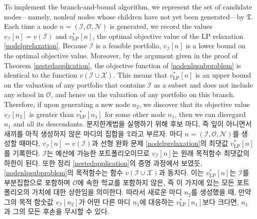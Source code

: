 \documentclass[11pt]{article} %
\theoremstyle{definition}
\theoremstyle{definition}
\begin{document}
\ifen
To implement the branch-and-bound algorithm, we represent the set of candidate nodes---namely, nonleaf nodes whose children have not yet been generated---by $\mathfrak{T}$. Each time a node $n= (\mathcal{I}, \mathcal{O}, \mathcal{N})$ is generated, we record the values $v_{\mathcal{I}}[n] = v(\mathcal{I})$ and $v^*_{\mathrm{LP}}[n]$, the optimal objective value of the LP relaxation \eqref{nodelprelaxation}. Because $\mathcal{I}$ is a feasible portfolio, $v_{\mathcal{I}}[n]$ is a lower bound on the optimal objective value. Moreover, by the argument given in the proof of Theorem \ref{nestedapplication}, the objective function of  \eqref{nodenlpsubproblem} is identical to the function $v(\mathcal{I} \cup \mathcal{X})$. This means that $v_{\mathrm{LP}}^*[n]$  is an upper bound on the valuation of any portfolio that contains $\mathcal{I}$ as a subset and does not include any school in $\mathcal{O}$, and hence on the valuation of any portfolio on this branch. Therefore, if upon generating a new node $n_2$, we discover that its objective value $v_{\mathcal{I}}[n_2]$ is greater than $v_{\mathrm{LP}}^*[n_1]$ for some other node $n_1$, then we can disregard $n_1$ and all its descendants. 
\else
분지한계법을 실행하기 위해 후보 마디, 즉 잎이 아니면서 새끼를 아직 생성하지 않은 마디의 집합을  $\mathfrak{T}$라고 부르자. 마디 $n= (\mathcal{I}, \mathcal{O}, \mathcal{N})$를 생성할 때마다, $v_{\mathcal{I}}[n] = v(\mathcal{I})$과 선형 완화 문제 \eqref{nodelprelaxation}의 최댓값 $v^*_{\mathrm{LP}}[n]$를 기록한다. $\mathcal{I}$는 예산에 가능한 포트폴리오이므로 $v_{\mathcal{I}}[n]$는 원래 목적함수 최댓값의 하한이 된다. 또한 정리 \ref{nestedapplication}의 증명 과정에서 보였듯, \eqref{nodenlpsubproblem}의 목적함수는 함수 $v(\mathcal{I} \cup \mathcal{X})$과 동치다. 이는 $v_{\mathrm{LP}}^*[n]$는 $\mathcal{I}$를 부분집합으로 포함하며 $\mathcal{O}$에 속한 학교를 포함하지 않은, 즉 이 가지에 있는 모든 포트폴리오의 가치에 대한 상한임을 의미한다. 따라서 새로운 마디 $n_2$를 생성했을 때, 만약 그의 목적 함숫값 $v_{\mathcal{I}}[n_2]$가 어떤 다른 마디 $n_1$에 대응하는 $v_{\mathrm{LP}}^*[n_1]$보다 크다면, $n_1$과 그의 모든 후손을 무시할 수 있다.
\fi
\end{document}
